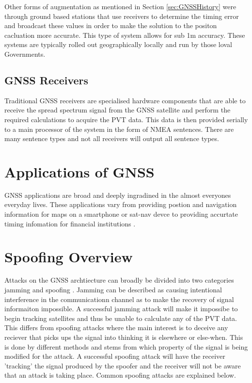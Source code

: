 Other forms of augmentation as mentioned in Section \ref{sec:GNSSHistory} were through ground based stations that use receivers to determine the timing error and broadcast these
values in order to make the solution to the positon cacluation more accurate. This type of system allows for sub 1m accuracy. These systems are typically rolled out
geographically locally and run by those loval Governments.

\subsection{GNSS Receivers}
Traditional GNSS receivers are specialised hardware components that are able to receive the spread spectrum signal from the GNSS satellite and perform the required
calculations to acquire the PVT data. This data is then provided serially to a main processor of the system in the form of NMEA sentences. There are many sentence types
and not all receivers will output all sentence types. 


\section{Applications of GNSS} \label{sec:ApplicationsGNSS}
GNSS applications are broad and deeply ingradined in the almost everyones everyday lives. These applications vary from providing postion and navigation information for
maps on a smartphone or sat-nav devce to providing accurtate timing infomation for financial institutions \cite{RN33}.


\section{Spoofing Overview}
Attacks on the GNSS archtiecture can broadly be divided into two categories jamming and spoofing \cite{RN33} \cite{RN32}. Jamming can be described as causing intentional
interference in the communicationn channel as to make the recovery of signal informaiton impossible. A successful jamming attack will make it impossibe to begin tracking
satellites and thus be unable to calculate any of the PVT data. This differs from spoofing attacks where the main interest is to deceive any reciever that picks ups the
signal into thinking it is elsewhere or else-when. This is done by different methods and stems from which property of the signal is being modified for the attack. A
successful spoofing attack will have the receiver 'tracking' the signal produced by the spoofer and the receiver will not be aware that an attack is taking place. Common
spoofing attacks are explained below.

